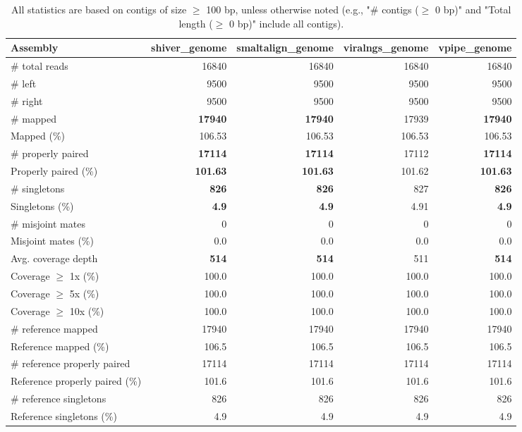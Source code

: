 \documentclass[12pt,a4paper]{article}
\begin{document}
\begin{table}[ht]
\begin{center}
\caption{All statistics are based on contigs of size $\geq$ 100 bp, unless otherwise noted (e.g., "\# contigs ($\geq$ 0 bp)" and "Total length ($\geq$ 0 bp)" include all contigs).}
\begin{tabular}{|l*{4}{|r}|}
\hline
Assembly & shiver\_genome & smaltalign\_genome & viralngs\_genome & vpipe\_genome \\ \hline
\# total reads & 16840 & 16840 & 16840 & 16840 \\ \hline
\# left & 9500 & 9500 & 9500 & 9500 \\ \hline
\# right & 9500 & 9500 & 9500 & 9500 \\ \hline
\# mapped & {\bf 17940} & {\bf 17940} & 17939 & {\bf 17940} \\ \hline
Mapped (\%) & 106.53 & 106.53 & 106.53 & 106.53 \\ \hline
\# properly paired & {\bf 17114} & {\bf 17114} & 17112 & {\bf 17114} \\ \hline
Properly paired (\%) & {\bf 101.63} & {\bf 101.63} & 101.62 & {\bf 101.63} \\ \hline
\# singletons & {\bf 826} & {\bf 826} & 827 & {\bf 826} \\ \hline
Singletons (\%) & {\bf 4.9} & {\bf 4.9} & 4.91 & {\bf 4.9} \\ \hline
\# misjoint mates & 0 & 0 & 0 & 0 \\ \hline
Misjoint mates (\%) & 0.0 & 0.0 & 0.0 & 0.0 \\ \hline
Avg. coverage depth & {\bf 514} & {\bf 514} & 511 & {\bf 514} \\ \hline
Coverage $\geq$ 1x (\%) & 100.0 & 100.0 & 100.0 & 100.0 \\ \hline
Coverage $\geq$ 5x (\%) & 100.0 & 100.0 & 100.0 & 100.0 \\ \hline
Coverage $\geq$ 10x (\%) & 100.0 & 100.0 & 100.0 & 100.0 \\ \hline
\# reference mapped & 17940 & 17940 & 17940 & 17940 \\ \hline
Reference mapped (\%) & 106.5 & 106.5 & 106.5 & 106.5 \\ \hline
\# reference properly paired & 17114 & 17114 & 17114 & 17114 \\ \hline
Reference properly paired (\%) & 101.6 & 101.6 & 101.6 & 101.6 \\ \hline
\# reference singletons & 826 & 826 & 826 & 826 \\ \hline
Reference singletons (\%) & 4.9 & 4.9 & 4.9 & 4.9 \\ \hline

\end{tabular}
\end{center}
\end{table}
\end{document}
